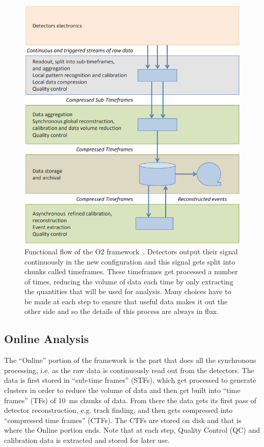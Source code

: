 \begin{figure}[h]
    \begin{center}
        \includegraphics[width=.6\textwidth]{Figs/O2_flow.png}
        \caption[Functional flow of the O2 framework]{Functional flow of the O2 framework~\cite{O2_Upgrade_TDR}. Detectors output their signal continuously in the new configuration and this signal gets split into chunks called timeframes. These timeframes get processed a number of times, reducing the volume of data each time by only extracting the quantities that will be used for analysis. Many choices have to be made at each step to ensure that useful data makes it out the other side and so the details of this process are always in flux.}
        \label{fig:O2_flow}
    \end{center}
\end{figure}

\subsection{Online Analysis}
The ``Online'' portion of the framework is the part that does all the synchronous processing, i.e. as the raw data is continuously read out from the detectors. The data is first stored in ``sub-time frames'' (STFs), which get processed to generate clusters in order to reduce the volume of data and then get built into ``time frames'' (TFs) of \SI{10}{\milli\second} chunks of data. From there the data gets its first pass of detector reconstruction, e.g. track finding, and then gets compressed into ``compressed time frames'' (CTFs). The CTFs are stored on disk and that is where the Online portion ends. Note that at each step, Quality Control (QC) and calibration data is extracted and stored for later use.

